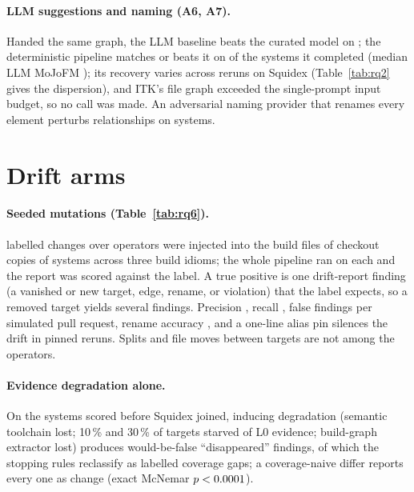 \documentclass[10pt,conference]{IEEEtran}
\begin{document}
\paragraph{LLM suggestions and naming (A6, A7).} Handed the same graph, the LLM baseline beats the
curated model on \rqThreeSixLlmGtPipelineList{}; the deterministic pipeline matches or beats it on
\rqThreeSixPipelineGeLlm{} of the \rqThreeSixLlmSystemsRan{} systems it completed (median LLM
MoJoFM \rqThreeSixLlmMedianMoJo{}); its recovery varies across reruns on Squidex (Table~\ref{tab:rq2}
gives the dispersion), and ITK's file graph exceeded the single-prompt input budget, so no call was made. An adversarial naming provider that renames every element
perturbs \rqThreeSevenMaxStructuralDelta{} relationships on \rqThreeSevenSystemsChecked{} systems.

\section{Drift arms}
\label{sec:tr-drift}




\paragraph{Seeded mutations (Table~\ref{tab:rq6}).} \rqSixMutationCount{} labelled changes over
\rqSixOperatorCount{} operators were injected into the build files of checkout copies of
\rqSixMutationSystems{} systems across three build idioms; the whole pipeline ran on each and the
report was scored against the label. A true positive is one drift-report finding (a vanished or
new target, edge, rename, or violation) that the label expects, so a removed target yields several
findings. Precision \rqSixPrecision{}, recall \rqSixRecall{}, \rqSixFpPerPr{} false findings per
simulated pull request, rename accuracy \rqSixRenameAccuracy{}, and a one-line alias pin silences
the drift in \rqSixAliasSurvival{} pinned reruns. Splits and file moves between targets are not
among the operators.

\paragraph{Evidence degradation alone.} On the \rqSixDegradationSystems{} systems scored before
Squidex joined, inducing degradation (semantic toolchain lost; 10\,\% and 30\,\% of targets starved
of L0 evidence; build-graph extractor lost) produces \rqSixWouldBeFalse{} would-be-false
``disappeared'' findings, of which the stopping rules reclassify \rqSixSuppressionRate{} as
labelled coverage gaps; a coverage-naive differ reports every one as change (exact McNemar
$p<0.0001$).
\end{document}
